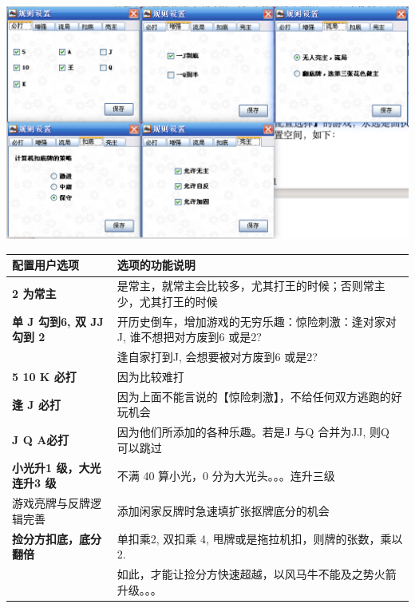 \documentclass[9pt, b5paper]{article}
\begin{document}
\includegraphics[width=.9\linewidth]{./pic/readme_20230510_160604.png}
\begin{center}
\begin{tabular}{ll}
\hline
配置用户选项 & 选项的功能说明\\
\hline
\textbf{2 为常主} & 是常主，就常主会比较多，尤其打王的时候；否则常主少，尤其打王的时候\\
\hline
\textbf{单 J 勾到6, 双 JJ 勾到 2} & 开历史倒车，增加游戏的无穷乐趣：惊险刺激：逢对家对J, 谁不想把对方废到6 或是2?\\
 & 逢自家打到J, 会想要被对方废到6 或是2?\\
\hline
\textbf{5 10 K 必打} & 因为比较难打\\
\textbf{逢 J 必打} & 因为上面不能言说的【惊险刺激】，不给任何双方逃跑的好玩机会\\
\textbf{J Q A必打} & 因为他们所添加的各种乐趣。若是J 与Q 合并为JJ, 则Q 可以跳过\\
\hline
\textbf{小光升1 级，大光连升3 级} & 不满 40 算小光，0 分为大光头。。。连升三级\\
\hline
游戏亮牌与反牌逻辑完善 & 添加闲家反牌时急速填扩张抠牌底分的机会\\
\hline
\textbf{捡分方扣底，底分翻倍} & 单扣乘2, 双扣乘 4, 甩牌或是拖拉机扣，则牌的张数，乘以 2.\\
 & 如此，才能让捡分方快速超越，以风马牛不能及之势火箭升级。。。\\
\hline
\end{tabular}
\end{center}
\end{document}
